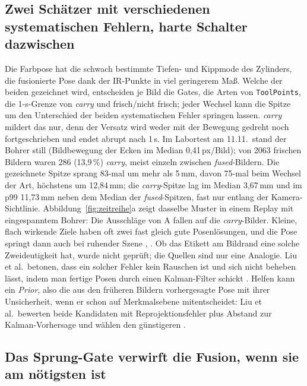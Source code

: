 \documentclass[11pt,a4paper,fleqn]{article}
\newcommand{\code}[1]{\texttt{#1}}
\begin{document}
\subsection{Zwei Schätzer mit verschiedenen systematischen Fehlern, harte Schalter dazwischen}
\label{sec:zwei}

Die Farbpose hat die schwach bestimmte Tiefen- und Kippmode des Zylinders, die fusionierte Pose dank der
IR-Punkte in viel geringerem Maß. Welche der beiden gezeichnet wird, entscheiden je Bild die Gates, die Arten von
\code{ToolPoints}, die 1-s-Grenze von \emph{carry} und frisch/nicht frisch; jeder Wechsel kann die Spitze um den
Unterschied der beiden systematischen Fehler springen lassen. \emph{carry} mildert das nur, denn der Versatz wird
weder mit der Bewegung gedreht noch fortgeschrieben und endet abrupt nach 1\,s. Im Labortest am 11.11.\ stand
der Bohrer still (Bildbewegung der Ecken im Median 0,41\,px/Bild); von 2063 frischen Bildern waren 286
(13,9\,\%) \emph{carry}, meist einzeln zwischen \emph{fused}-Bildern. Die gezeichnete Spitze sprang 83-mal um
mehr als 5\,mm, davon 75-mal beim Wechsel der Art, höchstens um 12,84\,mm; die \emph{carry}-Spitze lag im Median
3,67\,mm und im p99 11,73\,mm neben dem Median der \emph{fused}-Spitzen, fast nur entlang der Kamera-Sichtlinie.
Abbildung~\ref{fig:zeitreihe}a zeigt dasselbe Muster in einem Replay mit eingespanntem Bohrer: Die Ausschläge von
A fallen auf die \emph{carry}-Bilder. Kleine, flach wirkende Ziele haben oft zwei fast gleich gute
Posenlösungen, und die Pose springt dann auch bei ruhender Szene \cite[S.~2024, 2029]{schweighofer2006robust},
\cite[S.~5772, 5775]{jin2017sensor}. Ob das Etikett am Bildrand eine solche Zweideutigkeit hat, wurde nicht
geprüft; die Quellen sind nur eine Analogie. Liu et al.\ betonen, dass ein solcher Fehler kein Rauschen ist und
sich nicht beheben lässt, indem man fertige Posen durch einen Kalman-Filter schickt
\cite[Abschn.~I]{liu2021navigation}. Helfen kann ein \emph{Prior}, also die aus den früheren Bildern
vorhergesagte Pose mit ihrer Unsicherheit, wenn er schon auf Merkmalsebene mitentscheidet: Liu et al.\ bewerten
beide Kandidaten mit Reprojektionsfehler plus Abstand zur Kalman-Vorhersage und wählen den günstigeren
\cite[Abschn.~III-D]{liu2021navigation}.

\subsection{Das Sprung-Gate verwirft die Fusion, wenn sie am nötigsten ist}
\label{sec:gate}
\end{document}
